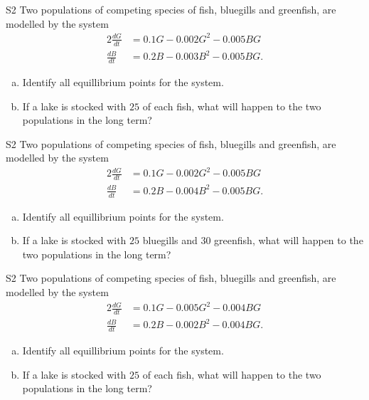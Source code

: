 \begin{problem}{S2}
Two populations of competing species of fish, bluegills and greenfish, are modelled by the system
\begin{alignat*}{2}
\frac{dG}{dt} &= 0.1G - 0.002G^2 - 0.005BG \\
\frac{dB}{dt} & = 0.2B - 0.003B^2 - 0.005BG.
\end{alignat*}
\begin{enumerate}[(a)]
\item Identify all equillibrium points for the system.
\item If a lake is stocked with \(25\) of each fish, what will happen to the two populations in the long term?
\end{enumerate}
\end{problem}

\begin{problem}{S2}
Two populations of competing species of fish, bluegills and greenfish, are modelled by the system
\begin{alignat*}{2}
\frac{dG}{dt} &= 0.1G - 0.002G^2 - 0.005BG \\
\frac{dB}{dt} & = 0.2B - 0.004B^2 - 0.005BG.
\end{alignat*}
\begin{enumerate}[(a)]
\item Identify all equillibrium points for the system.
\item If a lake is stocked with \(25\) bluegills and \(30\) greenfish, what will happen to the two populations in the long term?
\end{enumerate}
\end{problem}

\begin{problem}{S2}
Two populations of competing species of fish, bluegills and greenfish, are modelled by the system
\begin{alignat*}{2}
\frac{dG}{dt} &= 0.1G - 0.005G^2 - 0.004BG \\
\frac{dB}{dt} & = 0.2B - 0.002B^2 - 0.004BG.
\end{alignat*}
\begin{enumerate}[(a)]
\item Identify all equillibrium points for the system.
\item If a lake is stocked with \(25\) of each fish, what will happen to the two populations in the long term?
\end{enumerate}
\end{problem}

